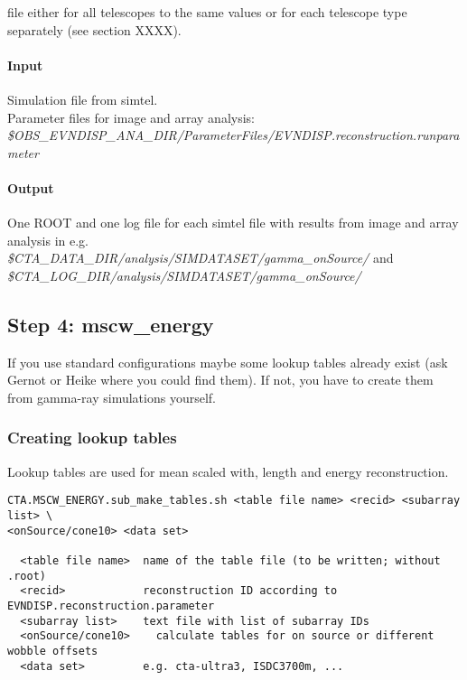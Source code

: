 \documentclass[titlepage,a4paper,twoside,11pt]{report}
\begin{document}
file either for all telescopes to the same values or for each telescope type separately
(see section XXXX). 

\paragraph{Input}
Simulation file from simtel. \\
Parameter files for image and array analysis:\\
{\it \$OBS\_EVNDISP\_ANA\_DIR/ParameterFiles/EVNDISP.reconstruction.runparameter}

\paragraph{Output}

One ROOT and one log file for each simtel file with results from image and array analysis in e.g. \\
{\it \$CTA\_DATA\_DIR/analysis/SIMDATASET/gamma\_onSource/} and \\
{\it \$CTA\_LOG\_DIR/analysis/SIMDATASET/gamma\_onSource/} 

\subsection{Step 4: mscw\_energy}

If you use standard configurations maybe some lookup tables already exist (ask Gernot or Heike where you could find them).
If not, you have to create them from gamma-ray simulations yourself.

\subsubsection{Creating lookup tables}

Lookup tables are used for mean scaled with, length and energy reconstruction.

\begin{lstlisting}
CTA.MSCW_ENERGY.sub_make_tables.sh <table file name> <recid> <subarray list> \
<onSource/cone10> <data set>

  <table file name>  name of the table file (to be written; without .root)
  <recid>            reconstruction ID according to EVNDISP.reconstruction.parameter
  <subarray list>    text file with list of subarray IDs
  <onSource/cone10>    calculate tables for on source or different wobble offsets
  <data set>         e.g. cta-ultra3, ISDC3700m, ... 
\end{lstlisting}
\end{document}
